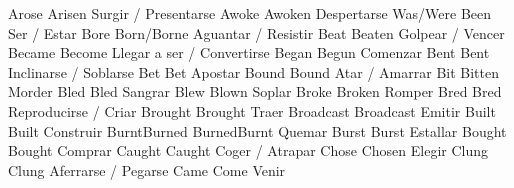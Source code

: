               {Arose}{}	            {Arisen}{}              {Surgir / Presentarse}{}
              {Awoke}{}	            {Awoken}{}              {Despertarse}{}
                 {Was/Were}{}	        {Been}{}                {Ser / Estar}{}
               {Bore}{}	            {Born/Borne}{}          {Aguantar / Resistir}{}
	            {Beat}{}	            {Beaten}{}              {Golpear / Vencer}{}
	            {Became}{}	            {Become}{}              {Llegar a ser / Convertirse}{}
	            {Began}{}	            {Begun}{}               {Comenzar}{}
	            {Bent}{}	            {Bent}{}                {Inclinarse / Soblarse}{}
	            {Bet}{}	                {Bet}{}                 {Apostar}{}
	            {Bound}{}	            {Bound}{}               {Atar / Amarrar}{}
	            {Bit}{}	                {Bitten}{}              {Morder}{}
	            {Bled}{}	            {Bled}{}                {Sangrar}{}
	            {Blew}{}	            {Blown}{}               {Soplar}{}
	            {Broke}{}	            {Broken}{}              {Romper}{}
	            {Bred}{}	            {Bred}{}                {Reproducirse / Criar}{}
	            {Brought}{}	            {Brought}{}             {Traer}{}
	        {Broadcast}{}	        {Broadcast}{}           {Emitir}{}
	            {Built}{}	            {Built}{}               {Construir}{}
	            {Burnt}{Burned}	        {Burned}{Burnt}         {Quemar}{}
	            {Burst}{}	            {Burst}{}               {Estallar}{}
	            {Bought}{}	            {Bought}{}              {Comprar}{}
	            {Caught}{}	            {Caught}{}              {Coger / Atrapar}{}
	            {Chose}{}	            {Chosen}{}              {Elegir}{}
	            {Clung}{}	            {Clung}{}               {Aferrarse / Pegarse}{}
	            {Came}{}	            {Come}{}                {Venir}{}
